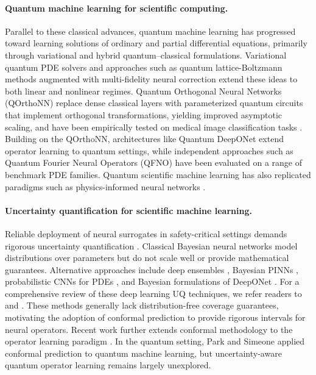 \documentclass{iopjournal}
\begin{document}
\paragraph{Quantum machine learning for scientific computing.}
Parallel to these classical advances, quantum machine learning has progressed toward learning solutions of ordinary and partial differential equations, primarily through variational and hybrid quantum–classical formulations. Variational quantum PDE solvers \cite{joo2021quvapde} and approaches such as quantum lattice-Boltzmann methods augmented with multi-fidelity neural correction \cite{jacob2025multifidelityquantum} extend these ideas to both linear and nonlinear regimes. Quantum Orthogonal Neural Networks (QOrthoNN) \cite{kerenidis2022qorthonn, landman2022medicalqorthonn} replace dense classical layers with parameterized quantum circuits that implement orthogonal transformations, yielding improved asymptotic scaling, and have been empirically tested on medical image classification tasks \cite{landman2022medicalqorthonn}. Building on the QOrthoNN, architectures like Quantum DeepONet \cite{xiao2025qdon} extend operator learning to quantum settings, while independent approaches such as Quantum Fourier Neural Operators (QFNO) \cite{jain2024qfno} have been evaluated on a range of benchmark PDE families. Quantum scientific machine learning has also replicated paradigms such as physics-informed neural networks \cite{trahan2024qpinn, farea2025qcpinn}.

\paragraph{Uncertainty quantification for scientific machine learning.}
Reliable deployment of neural surrogates in safety-critical settings demands rigorous uncertainty quantification \cite{psaros2023uq, zou2024operatoruq}. Classical Bayesian neural networks \cite{mackay1992practical, neal1996bnn} model distributions over parameters but do not scale well or provide mathematical guarantees. Alternative approaches include deep ensembles \cite{lakshminarayanan2017deep, psaros2023uq}, Bayesian PINNs \cite{yang2021bpinn}, probabilistic CNNs for PDEs \cite{winovich2019convpdeuq}, and Bayesian formulations of DeepONet \cite{lin2023bdeeponet}. For a comprehensive review of these deep learning UQ techniques, we refer readers to \cite{abdar2021uqreview} and \cite{psaros2023uq}. These methods generally lack distribution-free coverage guarantees, motivating the adoption of conformal prediction \cite{vovk1999conformal, vovk2022conformallearning, angelopoulous2023conformal} to provide rigorous intervals for neural operators. Recent work further extends conformal methodology to the operator learning paradigm \cite{moya2025conformal}. In the quantum setting, Park and Simeone \cite{park2023qcp} applied conformal prediction to quantum machine learning, but uncertainty-aware quantum operator learning remains largely unexplored.
\end{document}
